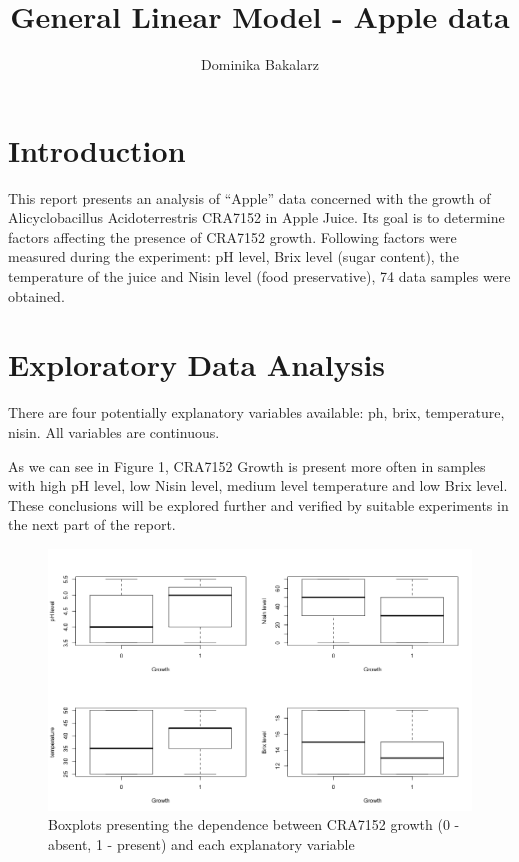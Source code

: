\documentclass{article}
\title {General Linear Model - Apple data}
\author{Dominika Bakalarz}
\date{}
\begin{document}
\maketitle

\section{Introduction}
This report presents an analysis of “Apple” data concerned with the growth of Alicyclobacillus Acidoterrestris CRA7152 in Apple Juice. Its goal is to determine factors affecting the presence of CRA7152 growth. Following factors were measured during the experiment: pH level, Brix level (sugar content), the temperature of the juice and Nisin level (food preservative), 74 data samples were obtained. \\


\section{Exploratory Data Analysis}
There are four potentially explanatory variables available: ph, brix, temperature, nisin. All variables are continuous. 

As we can see in Figure 1, CRA7152 Growth is present more often in samples with high pH level, low Nisin level, medium level temperature and low Brix level. These conclusions will be explored further and verified by suitable experiments in the next part of the report. 
\begin{figure}[h!]
\centering
\includegraphics[scale = 0.35]{boxplots.png}
\caption{Boxplots presenting the dependence between CRA7152 growth (0 - absent, 1 - present) and each explanatory variable}
\end{figure}
\\
\end{document}
